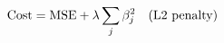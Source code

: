 \documentclass[preview]{standalone}
\begin{document}
\begin{align*}
\special{dvisvgm:raw <g id='unique000'>}\text{Cost} = \text{MSE}+ \lambda \sum_j \beta_j^2\quad (\text{L2 penalty})\special{dvisvgm:raw </g>}
\end{align*}
\end{document}
